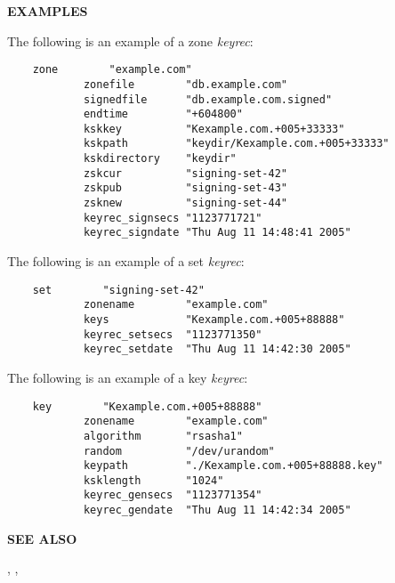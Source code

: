 {\bf EXAMPLES}

The following is an example of a zone {\it keyrec}:

\begin{verbatim}
    zone        "example.com"
            zonefile        "db.example.com"
            signedfile      "db.example.com.signed"
            endtime         "+604800"
            kskkey          "Kexample.com.+005+33333"
            kskpath         "keydir/Kexample.com.+005+33333"
            kskdirectory    "keydir"
            zskcur          "signing-set-42"
            zskpub          "signing-set-43"
            zsknew          "signing-set-44"
            keyrec_signsecs "1123771721"
            keyrec_signdate "Thu Aug 11 14:48:41 2005"
\end{verbatim}

The following is an example of a set {\it keyrec}:

\begin{verbatim}
    set        "signing-set-42"
            zonename        "example.com"
            keys            "Kexample.com.+005+88888"
            keyrec_setsecs  "1123771350"
            keyrec_setdate  "Thu Aug 11 14:42:30 2005"
\end{verbatim}

The following is an example of a key {\it keyrec}:

\begin{verbatim}
    key        "Kexample.com.+005+88888"
            zonename        "example.com"
            algorithm       "rsasha1"
            random          "/dev/urandom"
            keypath         "./Kexample.com.+005+88888.key"
            ksklength       "1024"
            keyrec_gensecs  "1123771354"
            keyrec_gendate  "Thu Aug 11 14:42:34 2005"
\end{verbatim}

{\bf SEE ALSO}


,
,


